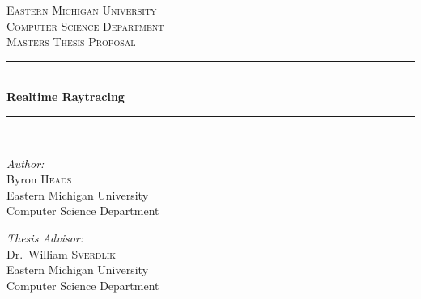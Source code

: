 \documentclass[11pt,a4paper,oneside]{article}
\newcommand{\HRule}{\rule{\linewidth}{0.5mm}}
\begin{document}
\begin{titlepage}
    \begin{center}
        \textsc{\large Eastern Michigan University}\\[1.5cm]
        \textsc{\large Computer Science Department}\\
        \textsc{\large Masters Thesis Proposal}\\[0.5cm]
        \HRule\\[0.4cm]
        { \huge \bfseries  Realtime Raytracing }\\[0.4cm]
        \HRule\\[1.5cm]

        \begin{minipage}{0.45\textwidth}
            \begin{flushleft} \large
                \emph{Author:}\\
                Byron \textsc{Heads} \\
                \small Eastern Michigan University\\
                \small Computer Science Department \\
            \end{flushleft}
        \end{minipage}
        \begin{minipage}{0.45\textwidth}
            \begin{flushright} \large
                \emph{Thesis Advisor:} \\
                Dr.~William \textsc{Sverdlik}\\
                \small Eastern Michigan University\\
                \small Computer Science Department
            \end{flushright}
        \end{minipage}

        \vfill


\end{center}
\end{titlepage}
\end{document}
